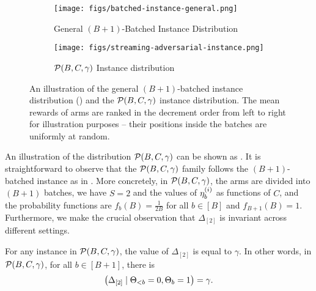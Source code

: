 \begin{figure}
	\centering
	\begin{subfigure}{0.95\textwidth}
		\centering
		\texttt{[image: figs/batched-instance-general.png]}
		\caption{General $(B+1)$-Batched Instance Distribution}
		\label{fig:batched-instance}
	\end{subfigure}%
	
	\begin{subfigure}{0.95\textwidth}
		\centering
		\texttt{[image: figs/streaming-adversarial-instance.png]}
		\caption{$\mathcal{P}(B, C, \gamma)$ Instance distribution}
		\label{fig:streaming-adv-instance}
	\end{subfigure}
	\caption{An illustration of the general $(B+1)$-batched instance distribution () and the $\mathcal{P}(B, C, \gamma)$ instance distribution. The mean rewards of arms are ranked in the decrement order from left to right for illustration purposes -- their positions inside the batches are uniformly at random.}
	\label{fig:lb-instance-illus}
\end{figure}


An illustration of the distribution $\mathcal{P}(B, C, \gamma)$ can be shown as . It is straightforward to observe that the $\mathcal{P}(B, C, \gamma)$ family follows the $(B+1)$-batched instance as in . More concretely, in $\mathcal{P}(B, C, \gamma)$, the arms are divided into $(B+1)$ batches, we have $S=2$ and the values of $\eta^{(i)}_{b}$ as functions of $C$, and the probability functions are $f_{b}(B)=\frac{1}{2B}$ for all $b \in [B]$ and $f_{B+1}(B)=1$. Furthermore, we make the crucial observation that $\Delta_{[2]}$ is invariant across different settings.

\FloatBarrier




\begin{observation}
	\label{obs:Delta-invariate}
	For any instance in $\mathcal{P}(B, C, \gamma)$, the value of $\Delta_{[2]}$ is equal to $\gamma$. In other words, in $\mathcal{P}(B, C, \gamma)$, for all $b\in[B+1]$, there is 
	\begin{align*}
		\left(\Delta_{[2]} \mid \Theta_{<b}=0, \Theta_{b}=1\right) = \gamma.
	\end{align*} %
\end{observation}


